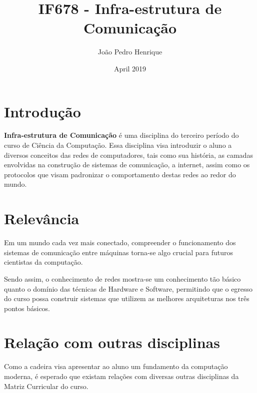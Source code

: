 \documentclass{article}
\title{IF678 - Infra-estrutura de Comunicação}
\author{João Pedro Henrique}
\date{April 2019}
\begin{document}
\maketitle

\section{Introdução}
\textbf{Infra-estrutura de Comunicação} é uma disciplina do terceiro período do curso de Ciência da Computação. Essa disciplina visa introduzir o aluno a diversos conceitos das redes de computadores, tais como sua história, as camadas envolvidas na construção de sistemas de comunicação, a internet, assim como os protocolos que visam padronizar o comportamento destas redes ao redor do mundo.

\section{Relevância}
Em um mundo cada vez mais conectado, compreender o funcionamento dos sistemas de comunicação entre máquinas torna-se algo crucial para futuros cientistas da computação.

Sendo assim, o conhecimento de redes mostra-se um conhecimento tão básico quanto o domínio das técnicas de Hardware e Software, permitindo que o egresso do curso possa construir sistemas que utilizem as melhores arquiteturas nos três pontos básicos.

\section{Relação com outras disciplinas}

Como a cadeira visa apresentar ao aluno um fundamento da computação moderna, é esperado que existam relações com diversas outras disciplinas da Matriz Curricular do curso.
\end{document}
